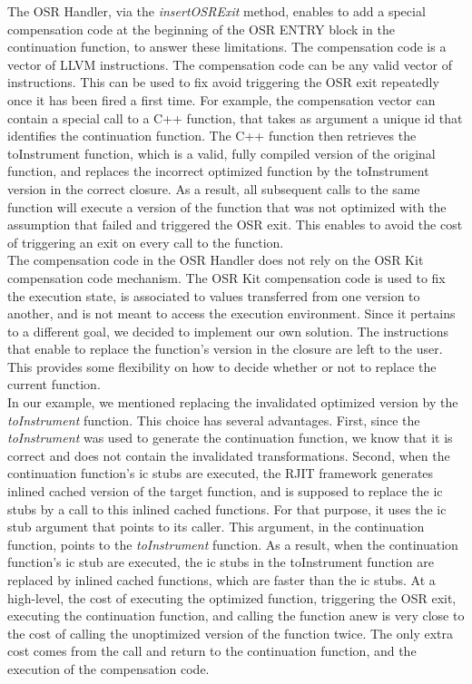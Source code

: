 The OSR Handler, via the \textit{insertOSRExit} method, enables to add a special compensation code at the beginning of the OSR ENTRY block in the continuation function, to answer these limitations.
The compensation code is a vector of LLVM instructions.
The compensation code can be any valid vector of instructions.
This can be used to fix avoid triggering the OSR exit repeatedly once it has been fired a first time.
For example, the compensation vector can contain a special call to a C++ function, that takes as argument a unique id that identifies the continuation function. 
The C++ function then retrieves the toInstrument function, which is a valid, fully compiled version of the original function, and replaces the incorrect optimized function by the toInstrument version in the correct closure.
As a result, all subsequent calls to the same function will execute a version of the function that was not optimized with the assumption that failed and triggered the OSR exit.
This enables to avoid the cost of triggering an exit on every call to the function.\\

The compensation code in the OSR Handler does not rely on the OSR Kit compensation code mechanism.
The OSR Kit compensation code is used to fix the execution state, is associated to values transferred from one version to another, and is not meant to access the execution environment.
Since it pertains to a different goal, we decided to implement our own solution.
The instructions that enable to replace the function's version in the closure are left to the user. 
This provides some flexibility on how to decide whether or not to replace the current function.\\

In our example, we mentioned replacing the invalidated optimized version by the \textit{toInstrument} function.
This choice has several advantages.
First, since the \textit{toInstrument} was used to generate the continuation function, we know that it is correct and does not contain the invalidated transformations.
Second, when the continuation function's ic stubs are executed, the RJIT framework generates inlined cached version of the target function, and is supposed to replace the ic stubs by a call to this inlined cached functions.
For that purpose, it uses the ic stub argument that points to its caller.
This argument, in the continuation function, points to the \textit{toInstrument} function.
As a result, when the continuation function's ic stub are executed, the ic stubs in the toInstrument function are replaced by inlined cached functions, which are faster than the ic stubs.
At a high-level, the cost of executing the optimized function, triggering the OSR exit, executing the continuation function, and calling the function anew is very close to the cost of calling the unoptimized version of the function twice.
The only extra cost comes from the call and return to the continuation function, and the execution of the compensation code.\\

